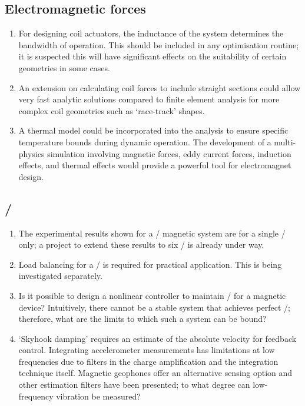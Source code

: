 \documentclass[10pt,a4paper]{memoir}
\begin{document}
\subsection{Electromagnetic forces}

\begin{enumerate}
\item For designing coil actuators, the inductance of the system determines the bandwidth of operation.
This should be included in any optimisation routine; it is suspected this will have significant effects on the suitability of certain geometries in some cases.

\item An extension on calculating coil forces to include straight sections could allow very fast analytic solutions compared to finite element analysis for more complex coil geometries such as `race-track' shapes.

\item A thermal model could be incorporated into the analysis to ensure specific temperature bounds during dynamic operation.
The development of a multi-physics simulation involving magnetic forces, eddy current forces, induction effects, and thermal effects would provide a powerful tool for electromagnet design.
\end{enumerate}

\subsection{\QZS/}

\begin{enumerate}

\item
The experimental results shown for a \qzs/ magnetic system are for a single \dof/ only; a project to extend these results to six \dof/ is already under way.

\item
Load balancing for a \qzs/ is required for practical application.
This is being investigated separately.

\item
Is it possible to design a nonlinear controller to maintain \qzs/ for a magnetic device?
Intuitively, there cannot be a stable system that achieves perfect \qzs/; therefore, what are the limits to which such a system can be bound?

\item
`Skyhook damping' requires an estimate of the absolute velocity for feedback control.
Integrating accelerometer measurements has limitations at low frequencies due to filters in the charge amplification and the integration technique itself.
Magnetic geophones offer an alternative sensing option and other estimation filters have been presented; to what degree can low-frequency vibration be measured?
\end{enumerate}
\end{document}
